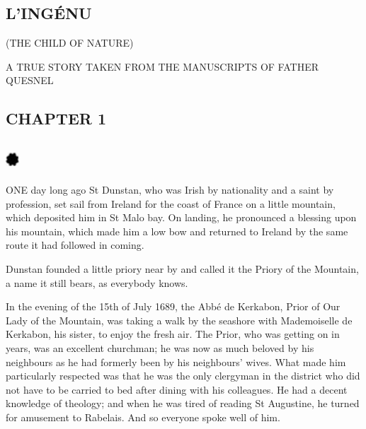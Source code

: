 \documentclass{article}
\begin{document}
\begin{center}
\section*{\textbf{L'INGÉNU }}

\begin{center}
(THE CHILD OF NATURE) 

A TRUE STORY TAKEN FROM THE MANUSCRIPTS OF FATHER QUESNEL 

\section*{\textbf{CHAPTER 1 }}

\section*{%
\includegraphics[width=14pt, height=15pt, keepaspectratio=true]{Zadig or L'Ingenu - Voltaire-fig023.jpg}
}

 
\end{center}

\baselineskip=12pt
\leftskip=0pt
ONE day long ago St Dunstan, who was Irish by nationality and a saint by profession, 
set sail from Ireland for the coast of France on a little mountain, which deposited 
him in St Malo bay. On landing, he pronounced a blessing upon his mountain, which 
made him a low bow and returned to Ireland by the same route it had followed in 
coming. 

Dunstan founded a little priory near by and called it the Priory of the Mountain, 
a name it still bears, as everybody knows. 

In the evening of the 15th of July 1689, the Abbé de Kerkabon, Prior of Our Lady 
of the Mountain, was taking a walk by the seashore with Mademoiselle de Kerkabon, 
his sister, to enjoy the fresh air. The Prior, who was getting on in years, was 
an excellent churchman; he was now as much beloved by his neighbours as he had 
formerly been by his neighbours' wives. What made him particularly respected was 
that he was the only clergyman in the district who did not have to be carried to 
bed after dining with his colleagues. He had a decent knowledge of theology; and 
when he was tired of reading St Augustine, he turned for amusement to Rabelais. 
And so everyone spoke well of him. 


\end{center}
\end{document}
